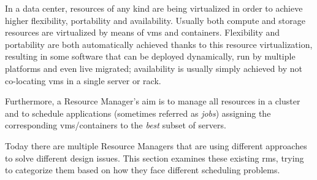 In a data center, resources of any kind are being virtualized in order to achieve higher flexibility, portability and availability.
Usually both compute and storage resources are virtualized by means of \glspl{vm} and containers.
Flexibility and portability are both automatically achieved thanks to this resource virtualization, resulting in some software that can be deployed dynamically, run by multiple platforms and even live migrated; availability is usually simply achieved by not co-locating \glspl{vm} in a single server or rack.

Furthermore, a Resource Manager's aim is to manage all resources in a cluster and to schedule applications (sometimes referred as \textit{jobs}) assigning the corresponding \glspl{vm}/containers to the \textit{best} subset of servers.

Today there are multiple Resource Managers that are using different approaches to solve different design issues.
This section examines these existing \glspl{rm}, trying to categorize them based on how they face different scheduling problems.